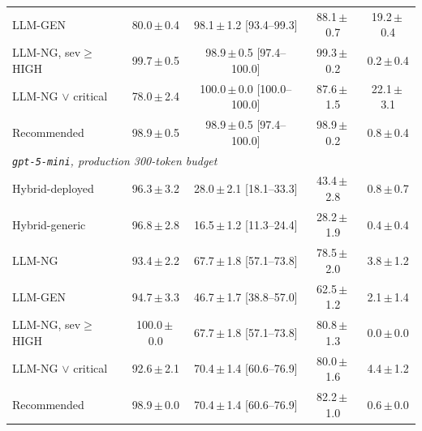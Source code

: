 \begin{table}[t]
\begin{tabular}{lcccc}
LLM-GEN & 80.0\,$\pm$\,0.4 & 98.1\,$\pm$\,1.2 {\scriptsize[93.4--99.3]} & 88.1\,$\pm$\,0.7 & 19.2\,$\pm$\,0.4 \\
LLM-NG, sev$\geq$HIGH & 99.7\,$\pm$\,0.5 & 98.9\,$\pm$\,0.5 {\scriptsize[97.4--100.0]} & 99.3\,$\pm$\,0.2 & 0.2\,$\pm$\,0.4 \\
LLM-NG $\lor$ critical & 78.0\,$\pm$\,2.4 & 100.0\,$\pm$\,0.0 {\scriptsize[100.0--100.0]} & 87.6\,$\pm$\,1.5 & 22.1\,$\pm$\,3.1 \\
Recommended & 98.9\,$\pm$\,0.5 & 98.9\,$\pm$\,0.5 {\scriptsize[97.4--100.0]} & 98.9\,$\pm$\,0.2 & 0.8\,$\pm$\,0.4 \\
\midrule\multicolumn{5}{l}{\textit{\texttt{gpt-5-mini}, production 300-token budget}}\\
Hybrid-deployed & 96.3\,$\pm$\,3.2 & 28.0\,$\pm$\,2.1 {\scriptsize[18.1--33.3]} & 43.4\,$\pm$\,2.8 & 0.8\,$\pm$\,0.7 \\
Hybrid-generic & 96.8\,$\pm$\,2.8 & 16.5\,$\pm$\,1.2 {\scriptsize[11.3--24.4]} & 28.2\,$\pm$\,1.9 & 0.4\,$\pm$\,0.4 \\
LLM-NG & 93.4\,$\pm$\,2.2 & 67.7\,$\pm$\,1.8 {\scriptsize[57.1--73.8]} & 78.5\,$\pm$\,2.0 & 3.8\,$\pm$\,1.2 \\
LLM-GEN & 94.7\,$\pm$\,3.3 & 46.7\,$\pm$\,1.7 {\scriptsize[38.8--57.0]} & 62.5\,$\pm$\,1.2 & 2.1\,$\pm$\,1.4 \\
LLM-NG, sev$\geq$HIGH & 100.0\,$\pm$\,0.0 & 67.7\,$\pm$\,1.8 {\scriptsize[57.1--73.8]} & 80.8\,$\pm$\,1.3 & 0.0\,$\pm$\,0.0 \\
LLM-NG $\lor$ critical & 92.6\,$\pm$\,2.1 & 70.4\,$\pm$\,1.4 {\scriptsize[60.6--76.9]} & 80.0\,$\pm$\,1.6 & 4.4\,$\pm$\,1.2 \\
Recommended & 98.9\,$\pm$\,0.0 & 70.4\,$\pm$\,1.4 {\scriptsize[60.6--76.9]} & 82.2\,$\pm$\,1.0 & 0.6\,$\pm$\,0.0 \\
\bottomrule\end{tabular}\end{table}

